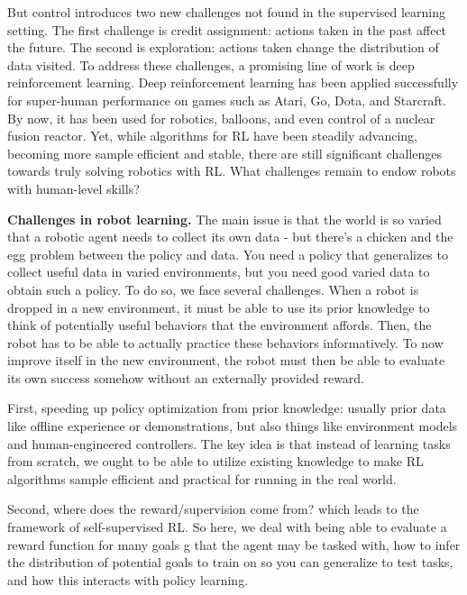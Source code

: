 But control introduces two new challenges not found in the supervised learning setting.
The first challenge is credit assignment: actions taken in the past affect the future.
The second is exploration: actions taken change the distribution of data visited.
To address these challenges, a promising line of work is deep reinforcement learning.
Deep reinforcement learning has been applied successfully for super-human performance on games such as Atari, Go, Dota, and Starcraft.
By now, it has been used for robotics, balloons, and even control of a nuclear fusion reactor.
Yet, while algorithms for RL have been steadily advancing, becoming more sample efficient and stable, there are still significant challenges towards truly solving robotics with RL.
What challenges remain to endow robots with human-level skills?

\textbf{Challenges in robot learning.} The main issue is that the world is so varied that a robotic agent needs to collect its own data - but there’s a chicken and the egg problem between the policy and data. You need a policy that generalizes to collect useful data in varied environments, but you need good varied data to obtain such a policy. 
To do so, we face several challenges. When a robot is dropped in a new environment, it must be able to use its prior knowledge to think of potentially useful behaviors that the environment affords. Then, the robot has to be able to actually practice these behaviors informatively. To now improve itself in the new environment, the robot must then be able to evaluate its own success somehow without an externally provided reward.

First, speeding up policy optimization from prior knowledge: usually prior data like offline experience or demonstrations, but also things like environment models and human-engineered controllers. The key idea is that instead of learning tasks from scratch, we ought to be able to utilize existing knowledge to make RL algorithms sample efficient and practical for running in the real world.

Second, where does the reward/supervision come from? which leads to the framework of self-supervised RL. So here, we deal with being able to evaluate a reward function for many goals g that the agent may be tasked with, how to infer the distribution of potential goals to train on so you can generalize to test tasks, and how this interacts with policy learning.

